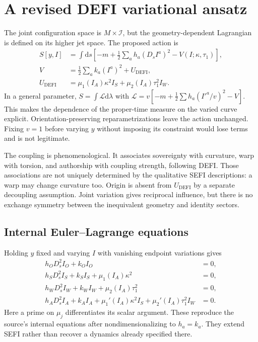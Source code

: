 \documentclass[aip,jmp,reprint,onecolumn,amsmath,amssymb]{revtex4-2}
\newcommand{\dd}{\mathrm{d}}
\newcommand{\Ds}{D_s}
\newcommand{\I}{\mathcal I}
\newcommand{\U}{U_{\mathrm{DEFI}}}
\begin{document}
\section{A revised DEFI variational ansatz}
The joint configuration space is $M\times\I$, but the geometry-dependent Lagrangian is defined on its higher jet space. The proposed action is
\begin{align}
 S[y,I]&=\int\dd s\left[-m+\tfrac12\sum_a h_a(\Ds I^a)^2-V(I;\kappa,\tau_1)\right],\label{eq:action}\\
 V&=\tfrac12\sum_a k_a(I^a)^2+\U,\label{eq:potential}\\
 \U&=\mu_1(I_A)\kappa^2 I_S+\mu_2(I_A)\tau_1^2 I_W.\label{eq:coupling}
\end{align}
In a general parameter, $S=\int\mathcal L\dd\lambda$ with $\mathcal L=v[-m+\frac12\sum h_a(I'^a/v)^2-V]$. This makes the dependence of the proper-time measure on the varied curve explicit. Orientation-preserving reparametrizations leave the action unchanged. Fixing $v=1$ before varying $y$ without imposing its constraint would lose terms and is not legitimate.

The coupling is phenomenological. It associates sovereignty with curvature, warp with torsion, and authorship with coupling strength, following DEFI. Those associations are not uniquely determined by the qualitative SEFI descriptions: a warp may change curvature too. Origin is absent from $\U$ by a separate decoupling assumption. Joint variation gives reciprocal influence, but there is no exchange symmetry between the inequivalent geometry and identity sectors.

\subsection{Internal Euler--Lagrange equations}
Holding $y$ fixed and varying $I$ with vanishing endpoint variations gives
\begin{align}
 h_O\Ds^2 I_O+k_O I_O&=0,\label{eq:origin}\\
 h_S\Ds^2 I_S+k_S I_S+\mu_1(I_A)\kappa^2&=0,\label{eq:S}\\
 h_W\Ds^2 I_W+k_W I_W+\mu_2(I_A)\tau_1^2&=0,\label{eq:W}\\
 h_A\Ds^2 I_A+k_A I_A
 +\mu_1'(I_A)\kappa^2 I_S+\mu_2'(I_A)\tau_1^2 I_W&=0.\label{eq:A}
\end{align}
Here a prime on $\mu_j$ differentiates its scalar argument. These reproduce the source's internal equations after nondimensionalizing to $h_a=k_a$. They extend SEFI rather than recover a dynamics already specified there.
\end{document}
